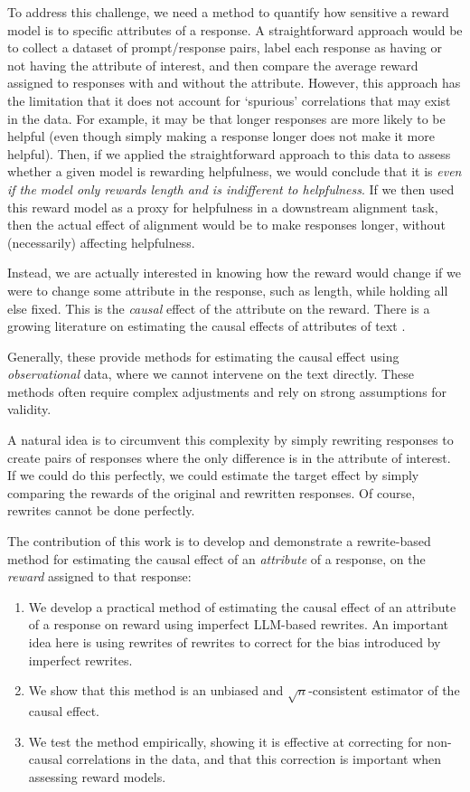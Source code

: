 \documentclass{article}
\begin{document}
To address this challenge, we need a method to quantify how sensitive a reward model is to specific attributes of a response.
A straightforward approach would be to collect a dataset of prompt/response pairs, label each response as having or not having the attribute of interest, and then compare the average reward assigned to responses with and without the attribute. However, this approach has the limitation that it does not account for `spurious' correlations that may exist in the data. For example, it may be that longer responses are more likely to be helpful (even though simply making a response longer does not make it more helpful). Then, if we applied the straightforward approach to this data to assess whether a given model is rewarding helpfulness, we would conclude that it is \emph{even if the model only rewards length and is indifferent to helpfulness}. If we then used this reward model as a proxy for helpfulness in a downstream alignment task, then the actual effect of alignment would be to make responses longer, without (necessarily) affecting helpfulness.

Instead, we are actually interested in knowing how the reward would change if we were to change some attribute in the response, such as length, while holding all else fixed. This is the \emph{causal} effect of the attribute on the reward.
There is a growing literature on estimating the causal effects of attributes of text \citep{feder2022causalinferencenaturallanguage,grimmer2022text, jin-etal-2022-causalnlp, chen2023causal, gui2023causalestimationtextdata}.

Generally, these provide methods for estimating the causal effect using \emph{observational} data, where we cannot intervene on the text directly. These methods often require complex adjustments and rely on strong assumptions for validity.

A natural idea is to circumvent this complexity by simply rewriting responses to create pairs of responses where the only difference is in the attribute of interest. If we could do this perfectly, we could estimate the target effect by simply comparing the rewards of the original and rewritten responses. Of course, rewrites cannot be done perfectly.

The contribution of this work is to develop and demonstrate a rewrite-based method for estimating the causal effect of an \emph{attribute} of a response, on the \emph{reward} assigned to that response:
\begin{enumerate}
  \item We develop a practical method of estimating the causal effect of an attribute of a response on reward using imperfect LLM-based rewrites. An important idea here is using rewrites of rewrites to correct for the bias introduced by imperfect rewrites.
  \item We show that this method is an unbiased and $\sqrt{n}$-consistent estimator of the causal effect.
  \item We test the method empirically, showing it is effective at correcting for non-causal correlations in the data, and that this correction is important when assessing reward models.
\end{enumerate}
\end{document}
